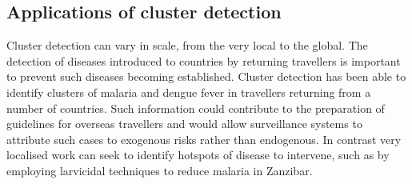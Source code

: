 \documentclass[a4paper,11pt]{article}
\begin{document}
\subsection{Applications of cluster detection}
Cluster detection can vary in scale, from the very local to the global.
The detection of diseases introduced to countries by returning travellers is important to prevent such diseases becoming established. 
Cluster detection has been able to identify clusters of malaria and dengue fever in travellers returning from a number of countries.\cite{Leder2013}
Such information could contribute to the preparation of guidelines for overseas travellers and would allow surveillance systems to attribute such cases to exogenous risks rather than endogenous. 
In contrast very localised work can seek to identify hotspots of disease to intervene, such as by employing larvicidal techniques to reduce malaria in Zanzibar.\cite{Bousema2013}
\end{document}
